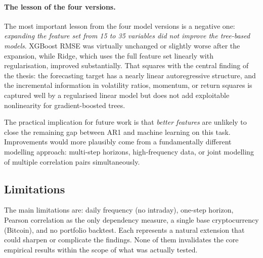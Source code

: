 \paragraph{The lesson of the four versions.}
The most important lesson from the four model versions is a negative one:
\emph{expanding the feature set from 15 to 35 variables did not improve the tree-based models}.
XGBoost RMSE was virtually unchanged or slightly worse after the expansion, while Ridge,
which uses the full feature set linearly with regularisation, improved substantially.
That squares with the central finding of the thesis: the forecasting target has
a nearly linear autoregressive structure, and the incremental information in
volatility ratios, momentum, or return squares is captured well by a regularised linear
model but does not add exploitable nonlinearity for gradient-boosted trees.

The practical implication for future work is that \emph{better features} are unlikely to
close the remaining gap between AR1 and machine learning on this task.
Improvements would more plausibly come from a fundamentally different modelling approach:
multi-step horizons, high-frequency data, or joint modelling of multiple correlation pairs
simultaneously.

\subsection{Limitations}

The main limitations are: daily frequency (no intraday), one-step horizon, Pearson correlation as the only dependency measure, a single base cryptocurrency (Bitcoin), and no portfolio backtest. Each represents a natural extension that could sharpen or complicate the findings. None of them invalidates the core empirical results within the scope of what was actually tested.
